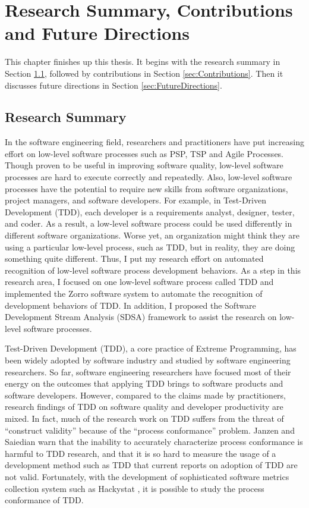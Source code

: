 \chapter{Research Summary, Contributions and Future Directions}
\label{ch:Conclusion}
This chapter finishes up this thesis. It begins with the research summary in Section \ref{sec:ResearchSummary}, followed by contributions in Section \ref{sec:Contributions}. Then it discusses future directions in Section \ref{sec:FutureDirections}.

\section{Research Summary}
\label{sec:ResearchSummary}
In the software engineering field, researchers and practitioners have put increasing effort on low-level software processes \cite{AgileAlliance,Larman:03} such as PSP, TSP and Agile Processes. Though proven to be useful in improving software quality\cite{Ferguson:97,Kamatar:00,MicrosoftTSP,Janzen:05}, low-level software processes are hard to execute correctly and repeatedly. Also, low-level software processes have the potential to require new skills from software organizations, project managers, and software developers. For example, in Test-Driven Development (TDD), each developer is a requirements analyst, designer, tester, and coder. As a result, a low-level software process could be used differently in different software organizations. Worse yet, an organization might think they are using a particular low-level process, such as TDD, but in reality, they are doing something quite different. Thus, I put my research effort on automated recognition of low-level software process development behaviors. As a step in this research area, I focused on one low-level software process called TDD and implemented the Zorro software system to automate the recognition of development behaviors of TDD. In addition, I proposed the Software Development Stream Analysis (SDSA) framework to assist the research on low-level software processes.

Test-Driven Development (TDD), a core practice of Extreme Programming, has been widely adopted by software industry and studied by software engineering researchers. So far, software engineering researchers have focused most of their energy on the outcomes that applying TDD brings to software products and software developers. However, compared to the claims made by practitioners, research findings of TDD on software quality and developer productivity are mixed. In fact, much of the research work on TDD suffers from the threat of ``construct validity'' \cite{Wang:04} because of the ``process conformance'' problem. Janzen and Saiedian \cite{Janzen:05} warn that the inability to accurately characterize process conformance is harmful to TDD research, and that it is so hard to measure the usage of a development method such as TDD that current reports on adoption of TDD are not valid. Fortunately, with the development of sophisticated software metrics collection system such as Hackystat \cite{Hackystat}, it is possible to study the process conformance of TDD. 

